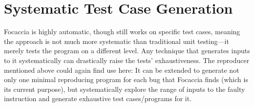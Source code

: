 \section{Systematic Test Case Generation}

Focaccia is highly automatic, though still works on specific test cases, meaning the approach is not much more
systematic than traditional unit testing---it merely tests the program on a different level. Any technique that
generates inputs to it systematically can drastically raise the tests' exhaustiveness. The reproducer mentioned above
could again find use here: It can be extended to generate not only one minimal reproducing program for each bug that
Focaccia finds (which is its current purpose), but systematically explore the range of inputs to the faulty instruction
and generate exhaustive test cases/programs for it.
